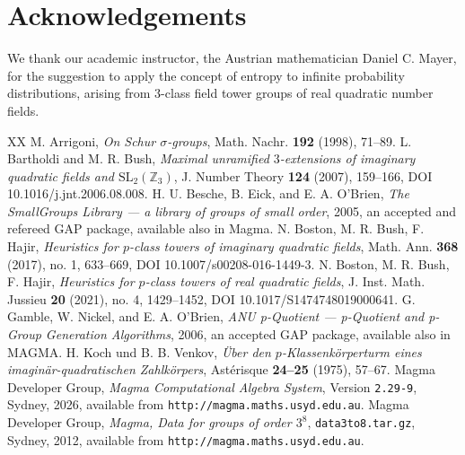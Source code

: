 \documentclass{amsart}
\theoremstyle{definition}
\theoremstyle{remark}
\begin{document}

\section{Acknowledgements}
\label{s:Acknowledgements}

\noindent
We thank our academic instructor,
the Austrian mathematician Daniel C. Mayer,
for the suggestion
to apply the concept of entropy
to infinite probability distributions,
arising from \(3\)-class field tower groups
of real quadratic number fields.
 

\begin{thebibliography}{XX}
%
M. Arrigoni,
\textit{On Schur \(\sigma\)-groups},
Math. Nachr.
\textbf{192}
(1998),
71--89.
%
L. Bartholdi and M. R. Bush,
\textit{Maximal unramified \(3\)-extensions of imaginary quadratic fields and \(\mathrm{SL}_2(\mathbb{Z}_3)\)},
J. Number Theory
\textbf{124}
(2007),
159--166,
DOI 10.1016/j.jnt.2006.08.008.
%
H. U. Besche, B. Eick, and E. A. O'Brien,
\textit{The SmallGroups Library --- a library of groups of small order},
2005,
an accepted and refereed GAP package, available also in Magma.
%
N. Boston, M. R. Bush, F. Hajir,
\textit{Heuristics for \(p\)-class towers of imaginary quadratic fields},
Math. Ann.
\textbf{368}
(2017),
no. 1,
633--669,
DOI 10.1007/s00208-016-1449-3.
%
N. Boston, M. R. Bush, F. Hajir,
\textit{Heuristics for \(p\)-class towers of real quadratic fields},
J. Inst. Math. Jussieu
\textbf{20}
(2021),
no. 4,
1429--1452,
DOI 10.1017/S1474748019000641.
%
G. Gamble, W. Nickel, and E. A. O'Brien,
\textit{ANU p-Quotient --- p-Quotient and p-Group Generation Algorithms},
2006,
an accepted GAP package, available also in MAGMA.
%
H. Koch und B. B. Venkov,
\textit{\"Uber den \(p\)-Klassenk\"orperturm eines imagin\"ar-quadratischen Zahlk\"orpers},
Ast\'erisque
\textbf{24--25}
(1975),
57--67.
%
Magma Developer Group,
\textit{Magma Computational Algebra System},
Version \texttt{2.29-9},
Sydney,
2026,
available from
\texttt{http://magma.maths.usyd.edu.au}.
%
Magma Developer Group,
\textit{Magma, Data for groups of order \(3^8\)},
\texttt{data3to8.tar.gz},
Sydney,
2012,
available from
\texttt{http://magma.maths.usyd.edu.au}.

\end{thebibliography}
\end{document}
